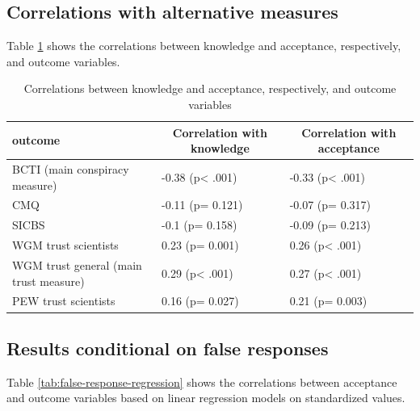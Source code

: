 \documentclass[
  doc,floatsintext]{apa6}
\begin{document}
\subsection{Correlations with alternative measures}\label{correlations-with-alternative-measures}

Table \ref{tab:correlations-outcomes} shows the correlations between knowledge and acceptance, respectively, and outcome variables.

\begin{table}[tbp]

\begin{center}
\begin{threeparttable}

\caption{\label{tab:correlations-outcomes}Correlations between knowledge and acceptance, respectively, and outcome variables}

\begin{tabular}{lll}
\toprule
outcome & \multicolumn{1}{c}{Correlation with knowledge} & \multicolumn{1}{c}{Correlation with acceptance}\\
\midrule
BCTI 
(main conspiracy measure) & -0.38 (p< .001) & -0.33 (p< .001)\\
CMQ & -0.11 (p= 0.121) & -0.07 (p= 0.317)\\
SICBS & -0.1 (p= 0.158) & -0.09 (p= 0.213)\\
WGM trust scientists & 0.23 (p= 0.001) & 0.26 (p< .001)\\
WGM trust general 
(main trust measure) & 0.29 (p< .001) & 0.27 (p< .001)\\
PEW trust scientists & 0.16 (p= 0.027) & 0.21 (p= 0.003)\\
\bottomrule
\end{tabular}

\end{threeparttable}
\end{center}

\end{table}

\subsection{Results conditional on false responses}\label{results-conditional-on-false-responses}

Table \ref{tab:false-response-regression} shows the correlations between acceptance and outcome variables based on linear regression models on standardized values.
\end{document}
